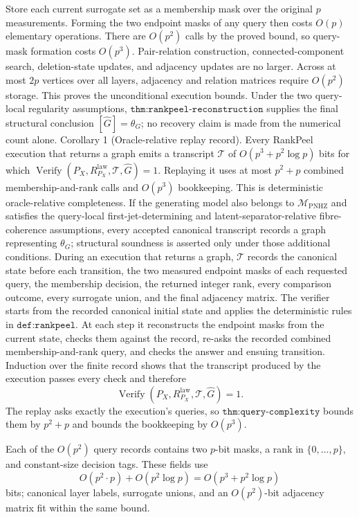Store each current surrogate set as a membership mask over the original \(p\) measurements.  Forming the two endpoint masks of any query then costs \(O(p)\) elementary operations.  There are \(O(p^2)\) calls by the proved bound, so query-mask formation costs \(O(p^3)\).  Pair-relation construction, connected-component search, deletion-state updates, and adjacency updates are no larger.  Across at most \(2p\) vertices over all layers, adjacency and relation matrices require \(O(p^2)\) storage.  This proves the unconditional execution bounds.  Under the two query-local regularity assumptions, \(\texttt{thm:rankpeel-reconstruction}\) supplies the final structural conclusion \([\widehat G]=\theta_G\); no recovery claim is made from the numerical count alone.
Corollary 1 (Oracle-relative replay record).  Every RankPeel execution that returns a graph emits a transcript \(\mathcal T\) of \(O(p^3+p^2\log p)\) bits for which \(\operatorname{Verify}(P_X,R^{\mathrm{law}}_{P_X},\mathcal T,\widehat G)=1\).  Replaying it uses at most \(p^2+p\) combined membership-and-rank calls and \(O(p^3)\) bookkeeping.  This is deterministic oracle-relative completeness.  If the generating model also belongs to \(\mathcal M_{\mathrm{PNHZ}}\) and satisfies the query-local first-jet-determining and latent-separator-relative fibre-coherence assumptions, every accepted canonical transcript records a graph representing \(\theta_G\); structural soundness is asserted only under those additional conditions.
During an execution that returns a graph, \(\mathcal T\) records the canonical state before each transition, the two measured endpoint masks of each requested query, the membership decision, the returned integer rank, every comparison outcome, every surrogate union, and the final adjacency matrix.  The verifier starts from the recorded canonical initial state and applies the deterministic rules in \(\texttt{def:rankpeel}\).  At each step it reconstructs the endpoint masks from the current state, checks them against the record, re-asks the recorded combined membership-and-rank query, and checks the answer and ensuing transition.  Induction over the finite record shows that the transcript produced by the execution passes every check and therefore
\[
 \operatorname{Verify}(P_X,R^{\mathrm{law}}_{P_X},\mathcal T,\widehat G)=1. \tag{1}
\]
The replay asks exactly the execution's queries, so \(\texttt{thm:query-complexity}\) bounds them by \(p^2+p\) and bounds the bookkeeping by \(O(p^3)\).

Each of the \(O(p^2)\) query records contains two \(p\)-bit masks, a rank in \(\{0,\ldots,p\}\), and constant-size decision tags.  These fields use
\[
 O(p^2\cdot p)+O(p^2\log p)=O(p^3+p^2\log p) \tag{2}
\]
bits; canonical layer labels, surrogate unions, and an \(O(p^2)\)-bit adjacency matrix fit within the same bound.

